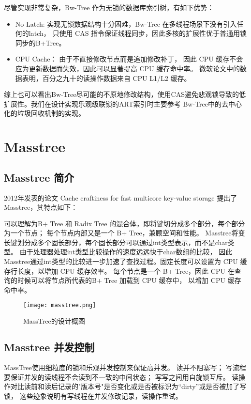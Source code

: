 尽管实现非常复杂，Bw-Tree 作为无锁的数据库索引树，有如下优势：
\begin{itemize}
\item No Latch: 实现无锁数据结构十分困难，Bw-Tree 在多线程场景下没有引入任何的latch，
只使用 CAS 指令保证线程同步，因此多核的扩展性优于普通用锁同步的B+Tree。

\item CPU Cache： 由于不直接修改节点而是追加修改补丁，
因此 CPU 缓存不会应为更新数据而失效，因此可以显著提高 CPU 缓存命中率。
微软论文中的数据表明，百分之九十的读操作数据来自 CPU L1/L2 缓存。
\end{itemize}

综上也可以看出Bw-Tree尽可能的不原地修改结构，使用CAS避免悲观锁导致的低扩展性。我们在设计实现乐观级联锁的ART索引时主要参考
Bw-Tree中的去中心化的垃圾回收机制的实现。

\section{Masstree}
\subsection{Masstree 简介}
2012年发表的论文 Cache craftiness for fast multicore key-value storage 提出了 Masstree，其特点如下：

可以理解为B+ Tree 和 Radix Tree 的混合体，即将键切分成多个部分，每个部分为一个节点；
每个节点内部又是一个 B+ Tree，兼顾空间和性能。
Masstree将变长键划分成多个固长部分，每个固长部分可以通过int类型表示，而不是char类型。
由于处理器处理int类型比较操作的速度远远快于char数组的比较，
因此Masstree通过int类型的比较进一步加速了查找过程。固定长度可以设置为 CPU 缓存行长度，以增加 CPU 缓存效率。
每个节点是一个 B+ Tree，因此 CPU 在查询的时候可以将节点所代表的B+ Tree 加载到 CPU 缓存中，
以增加 CPU 缓存命中率\cite{binna2018hot}。

\begin{figure}[h]
  \centering
  \texttt{[image: masstree.png]}
  \caption{MassTree的设计概图}
  \label{fig:masstree}
\end{figure}

\subsection{Masstree 并发控制}
MassTree使用细粒度的锁和乐观并发控制来保证高并发。
读并不阻塞写；
写流程要保证并发的读线程不会读到不一致的中间状态；
写写之间用自旋锁互斥。
读操作对比读前和读后记录的"版本号"是否变化或是否被标识为“dirty”或是否被加了写锁，
这些迹象说明有写线程在并发修改记录，读操作重试。


